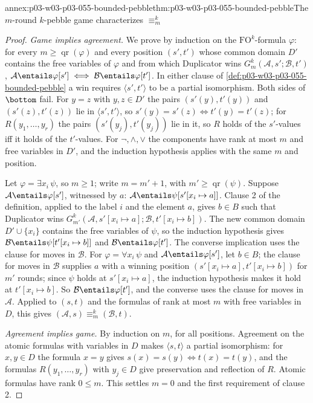 \begin{annexitem}{annex:p03-w03-p03-055-bounded-pebble}{thm:p03-w03-p03-055-bounded-pebble}{The \(m\)-round \(k\)-pebble game characterizes \(\equiv^k_m\)}
\begin{proof}
\emph{Game implies agreement.} We prove by induction on the
\(\mathrm{FO}^k\)-formula \(\varphi\): for every \(m\ge\operatorname{qr}(\varphi)\)
and every position \((s',t')\) whose common domain \(D'\) contains the free
variables of \(\varphi\) and from which Duplicator wins
\(G^k_m(\mathcal A,s';\mathcal B,t')\),
\(\mathcal A\entails\varphi[s']\iff\mathcal B\entails\varphi[t']\). In
either clause of \cref{def:p03-w03-p03-055-bounded-pebble} a win requires
\(\langle s',t'\rangle\) to be a partial isomorphism. Both sides of
\(\bottom\) fail. For \(y=z\) with \(y,z\in D'\) the pairs
\((s'(y),t'(y))\) and \((s'(z),t'(z))\) lie in \(\langle s',t'\rangle\), so
\(s'(y)=s'(z)\iff t'(y)=t'(z)\); for \(R(y_1,\ldots,y_r)\) the pairs
\((s'(y_j),t'(y_j))\) lie in it, so \(R\) holds of the \(s'\)-values iff it
holds of the \(t'\)-values. For \(\neg,\wedge,\vee\) the components have rank
at most \(m\) and free variables in \(D'\), and the induction hypothesis
applies with the same \(m\) and position.

Let \(\varphi=\exists x_i\,\psi\), so \(m\ge1\); write \(m=m'+1\), with
\(m'\ge\operatorname{qr}(\psi)\). Suppose \(\mathcal A\entails\varphi[s']\),
witnessed by \(a\): \(\mathcal A\entails\psi[s'[x_i\mapsto a]]\). Clause 2
of the definition, applied to the label \(i\) and the element \(a\), gives
\(b\in B\) such that Duplicator wins
\(G^k_{m'}(\mathcal A,s'[x_i\mapsto a];\mathcal B,t'[x_i\mapsto b])\). The new
common domain \(D'\cup\{x_i\}\) contains the free variables of \(\psi\), so
the induction hypothesis gives \(\mathcal B\entails\psi[t'[x_i\mapsto b]]\)
and \(\mathcal B\entails\varphi[t']\). The converse implication uses the
clause for moves in \(\mathcal B\). For \(\varphi=\forall x_i\,\psi\) and
\(\mathcal A\entails\varphi[s']\), let \(b\in B\); the clause for moves in
\(\mathcal B\) supplies \(a\) with a winning position
\((s'[x_i\mapsto a],t'[x_i\mapsto b])\) for \(m'\) rounds; since
\(\psi\) holds at \(s'[x_i\mapsto a]\), the induction hypothesis makes it hold
at \(t'[x_i\mapsto b]\). So \(\mathcal B\entails\varphi[t']\), and the
converse uses the clause for moves in \(\mathcal A\). Applied to \((s,t)\)
and the formulas of rank at most \(m\) with free variables in \(D\), this
gives \((\mathcal A,s)\equiv^k_m(\mathcal B,t)\).

\emph{Agreement implies game.} By induction on \(m\), for all positions.
Agreement on the atomic formulas with variables in \(D\) makes
\(\langle s,t\rangle\) a partial isomorphism: for \(x,y\in D\) the formula
\(x=y\) gives \(s(x)=s(y)\iff t(x)=t(y)\), and the formulas
\(R(y_1,\ldots,y_r)\) with \(y_j\in D\) give preservation and reflection of
\(R\). Atomic formulas have rank \(0\le m\). This settles \(m=0\) and the
first requirement of clause 2.


\end{proof}
\end{annexitem}
